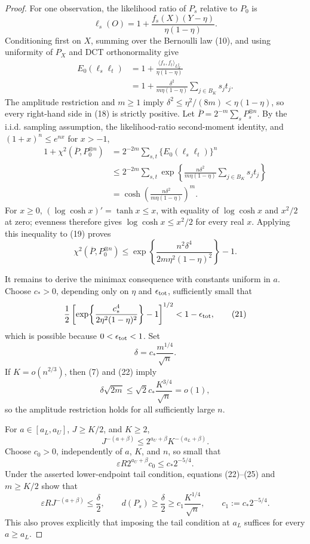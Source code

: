 \documentclass{article}
\begin{document}
\begin{proof}
For one observation, the likelihood ratio of \(P_s\) relative to \(P_0\) is
\[
 \ell_s(O)=1+\frac{f_s(X)(Y-\eta)}{\eta(1-\eta)}.
 \tag{17}
\]
Conditioning first on \(X\), summing over the Bernoulli law (10), and using uniformity of \(P_X\) and DCT orthonormality give
\[
 \begin{aligned}
 E_0(\ell_s\ell_t)
 &=1+\frac{\langle f_s,f_t\rangle_{L^2_X}}{\eta(1-\eta)} \\
 &=1+\frac{\delta^2}{m\eta(1-\eta)}
       \sum_{j\in B_K}s_jt_j.
 \end{aligned}
 \tag{18}
\]
The amplitude restriction and \(m\geq1\) imply
\(\delta^2\leq\eta^2/(8m)<\eta(1-\eta)\), so every right-hand side in (18) is strictly positive.  Let
\(\overline P=2^{-m}\sum_sP_s^{\otimes n}\).  By the i.i.d. sampling assumption, the likelihood-ratio second-moment identity, and \((1+x)^n\leq e^{nx}\) for \(x>-1\),
\[
 \begin{aligned}
 1+\chi^2(\overline P,P_0^{\otimes n})
 &=2^{-2m}\sum_{s,t}\{E_0(\ell_s\ell_t)\}^n \\
 &\leq 2^{-2m}\sum_{s,t}
   \exp\!\left\{
    \frac{n\delta^2}{m\eta(1-\eta)}
    \sum_{j\in B_K}s_jt_j
   \right\} \\
 &=\cosh\!\left(\frac{n\delta^2}{m\eta(1-\eta)}\right)^m.
 \end{aligned}
 \tag{19}
\]
For \(x\geq0\), \((\log\cosh x)'=\tanh x\leq x\), with equality of \(\log\cosh x\) and \(x^2/2\) at zero; evenness therefore gives \(\log\cosh x\leq x^2/2\) for every real \(x\).  Applying this inequality to (19) proves
\[
 \chi^2(\overline P,P_0^{\otimes n})
 \leq
 \exp\!\left\{\frac{n^2\delta^4}
 {2m\eta^2(1-\eta)^2}\right\}-1.
 \tag{20}
\]

It remains to derive the minimax consequence with constants uniform in \(a\).  Choose \(c_*>0\), depending only on \(\eta\) and \(\epsilon_{\rm tot}\), sufficiently small that
\[
 \frac12\left[
  \exp\!\left\{\frac{c_*^4}{2\eta^2(1-\eta)^2}\right\}-1
 \right]^{1/2}<1-\epsilon_{\rm tot},
 \tag{21}
\]
which is possible because \(0<\epsilon_{\rm tot}<1\).  Set
\[
 \delta=c_*\frac{m^{1/4}}{\sqrt n}.
 \tag{22}
\]
If \(K=o(n^{2/3})\), then (7) and (22) imply
\[
 \delta\sqrt{2m}
 \leq \sqrt2c_*\frac{K^{3/4}}{\sqrt n}=o(1),
 \tag{23}
\]
so the amplitude restriction holds for all sufficiently large \(n\).

For \(a\in[a_L,a_U]\), \(J\geq K/2\), and \(K\geq2\),
\[
 J^{-(a+\beta)}
 \leq 2^{a_U+\beta}K^{-(a_L+\beta)}.
 \tag{24}
\]
Choose \(c_0>0\), independently of \(a\), \(K\), and \(n\), so small that
\[
 \varepsilon R2^{a_U+\beta}c_0
 \leq c_*2^{-5/4}.
 \tag{25}
\]
Under the asserted lower-endpoint tail condition, equations (22)--(25) and \(m\geq K/2\) show that
\[
 \varepsilon RJ^{-(a+\beta)}
 \leq\frac\delta2,
 \qquad
 d(P_s)\geq\frac\delta2
 \geq c_1\frac{K^{1/4}}{\sqrt n},
 \qquad
 c_1:=c_*2^{-5/4}.
 \tag{26}
\]
This also proves explicitly that imposing the tail condition at \(a_L\) suffices for every \(a\geq a_L\).


\end{proof}
\end{document}
